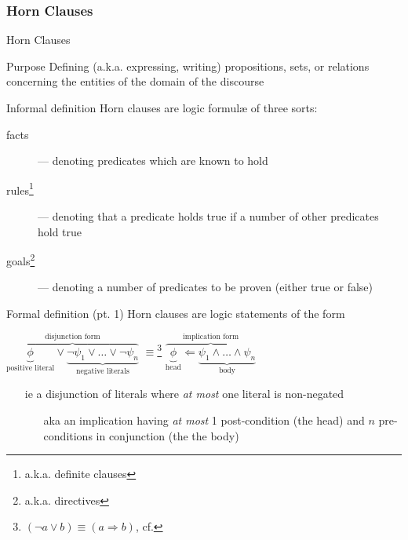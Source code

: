 \documentclass[presentation]{beamer}\mode<presentation>{\usetheme{AMSBolognaFC}}
\begin{document}
\subsubsection{Horn Clauses}

\begin{frame}[allowframebreaks]{Horn Clauses}
    \begin{block}{Purpose}\centering
        Defining (a.k.a. expressing, writing) \alert{propositions}, \alert{sets}, or \alert{relations} concerning the entities of the \alert{domain of the discourse}
    \end{block}
    \begin{block}{Informal definition}
        Horn clauses are logic formul\ae{} of three sorts:
        \begin{description}
            \item[facts] --- denoting predicates which are known to hold
            \item[rules\footnote{a.k.a. definite clauses}] --- denoting that a predicate holds true if a number of other predicates hold true
            \item[goals\footnote{a.k.a. directives}] --- denoting a number of predicates to be proven (either true or false)
        \end{description}
    \end{block}
    \begin{block}{Formal definition (pt. 1)}
        Horn clauses are logic statements of the form
        \begin{center}
            $\overbrace{\underbrace{\phi}_{\text{positive literal}} \vee \underbrace{\neg\psi_1 \vee \ldots \vee \neg \psi_n}_{\text{negative literals}}}^{\text{disjunction form}}$
            \qquad $\equiv$\footnote{$(\neg a \vee b) \equiv (a \Rightarrow b)$, cf. } \qquad
            $\overbrace{\underbrace{\phi}_{\text{head}} \Leftarrow \underbrace{\psi_1 \wedge \ldots \wedge \psi_n}_{\text{body}}}^\text{implication form}$
        \end{center}
        \begin{itemize}
            \item[ie] a \alert{disjunction} of \alert{literals} where \emph{at most} one literal is non-negated
            \begin{itemize}
                \item[aka] an \alert{implication} having \emph{at most} 1 post-condition (the \alert{head}) and $n$ pre-conditions in conjunction (the \alert{the body})

\end{itemize}
\end{itemize}
\end{block}
\end{frame}
\end{document}
